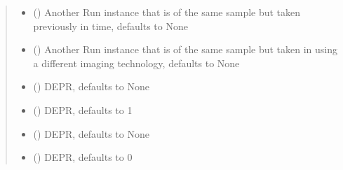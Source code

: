\documentclass[letterpaper,10pt,english]{sphinxmanual}
\begin{document}
\begin{fulllineitems}
\begin{fulllineitems}
\begin{quote}
\begin{description}
\begin{itemize}
\item {} 
 ({\hyperref[\detokenize{polo.crystallography:polo.crystallography.run.Run}]{}}\sphinxstyleliteralemphasis{\sphinxupquote{, }}) \textendash{} Another Run instance that is of the same sample 
but taken previously in time, defaults to None

\item {} 
 ({\hyperref[\detokenize{polo.crystallography:polo.crystallography.run.Run}]{}}\sphinxstyleliteralemphasis{\sphinxupquote{, }}) \textendash{} Another Run instance that is of the same sample 
but taken in using a different imaging technology,
defaults to None

\item {} 
 (\sphinxstyleliteralemphasis{\sphinxupquote{, }}) \textendash{} DEPR, defaults to None

\item {} 
 (\sphinxstyleliteralemphasis{\sphinxupquote{, }}) \textendash{} DEPR, defaults to 1

\item {} 
 (\sphinxstyleliteralemphasis{\sphinxupquote{, }}) \textendash{} DEPR, defaults to None

\item {} 
 (\sphinxstyleliteralemphasis{\sphinxupquote{, }}) \textendash{} DEPR, defaults to 0


\end{itemize}
\end{description}
\end{quote}
\end{fulllineitems}
\end{fulllineitems}
\end{document}

